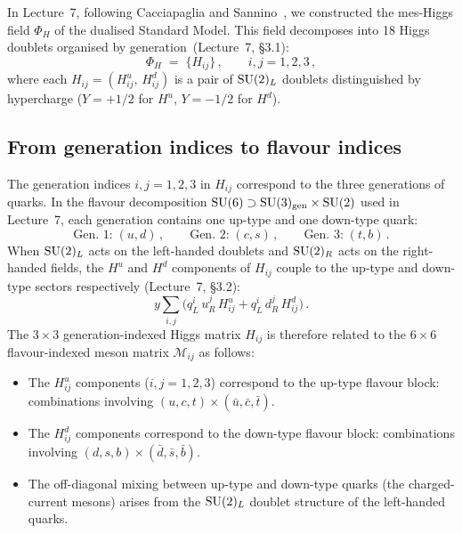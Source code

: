 \documentclass[11pt,a4paper]{article}
\begin{document}
In Lecture~7, following Cacciapaglia and
Sannino~\cite{CacciapagliaSannino2024}, we constructed the
mes-Higgs field $\Phi_H$ of the dualised Standard Model.  This
field decomposes into 18 Higgs doublets organised by
generation~(Lecture~7, \S3.1):
\begin{equation}\label{eq:Phi-H-recall}
  \Phi_H \;=\; \{H_{ij}\}\,,
  \qquad i,j = 1,2,3\,,
\end{equation}
where each $H_{ij} = (H_{ij}^u,\, H_{ij}^d)$ is a pair of $\mathrm{SU}(2)_L$
doublets distinguished by hypercharge ($Y = +1/2$ for $H^u$,
$Y = -1/2$ for $H^d$).

\subsection{From generation indices to flavour indices}

The generation indices $i,j = 1,2,3$ in $H_{ij}$ correspond to the
three generations of quarks.  In the flavour decomposition
$\mathrm{SU}(6) \supset \mathrm{SU}(3)_{\mathrm{gen}} \times \mathrm{SU}(2)$ used in Lecture~7,
each generation contains one up-type and one down-type quark:
\begin{equation}\label{eq:generation-flavour}
  \text{Gen.~1:}\; (u, d)\,,\qquad
  \text{Gen.~2:}\; (c, s)\,,\qquad
  \text{Gen.~3:}\; (t, b)\,.
\end{equation}
When $\mathrm{SU}(2)_L$ acts on the left-handed doublets and $\mathrm{SU}(2)_R$ acts on
the right-handed fields, the $H^u$ and $H^d$ components of $H_{ij}$
couple to the up-type and down-type sectors respectively (Lecture~7,
\S3.2):
\begin{equation}\label{eq:yukawa-recall}
  y \sum_{i,j}\bigl(q_L^i\, u_R^j\, H_{ij}^u
  + q_L^i\, d_R^j\, H_{ij}^d\bigr)\,.
\end{equation}
The $3 \times 3$ generation-indexed Higgs matrix $H_{ij}$ is therefore
related to the $6 \times 6$ flavour-indexed meson matrix
$\mathcal{M}_{ij}$ as follows:
\begin{itemize}
  \item The $H_{ij}^u$ components ($i,j = 1,2,3$) correspond to the
    up-type flavour block: combinations involving $(u, c, t) \times
    (\bar{u}, \bar{c}, \bar{t})$.
  \item The $H_{ij}^d$ components correspond to the down-type flavour
    block: combinations involving $(d, s, b) \times (\bar{d}, \bar{s},
    \bar{b})$.
  \item The off-diagonal mixing between up-type and down-type quarks
    (the charged-current mesons) arises from the
    $\mathrm{SU}(2)_L$ doublet structure of the left-handed quarks.
\end{itemize}
\end{document}
